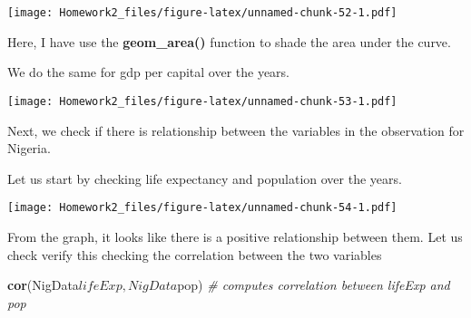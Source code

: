 \documentclass[]{article}
\newenvironment{Shaded}{\begin{snugshade}}{\end{snugshade}}
\newcommand{\KeywordTok}[1]{\textcolor[rgb]{0.13,0.29,0.53}{\textbf{{#1}}}}
\newcommand{\DataTypeTok}[1]{\textcolor[rgb]{0.13,0.29,0.53}{{#1}}}
\newcommand{\StringTok}[1]{\textcolor[rgb]{0.31,0.60,0.02}{{#1}}}
\newcommand{\CommentTok}[1]{\textcolor[rgb]{0.56,0.35,0.01}{\textit{{#1}}}}
\newcommand{\NormalTok}[1]{{#1}}
\begin{document}
\texttt{[image: Homework2\_files/figure-latex/unnamed-chunk-52-1.pdf]}

Here, I have use the \textbf{geom\_area()} function to shade the area
under the curve.

We do the same for gdp per capital over the years.

\begin{Shaded}
\end{Shaded}

\texttt{[image: Homework2\_files/figure-latex/unnamed-chunk-53-1.pdf]}

Next, we check if there is relationship between the variables in the
observation for Nigeria.

Let us start by checking life expectancy and population over the years.

\begin{Shaded}
\end{Shaded}

\texttt{[image: Homework2\_files/figure-latex/unnamed-chunk-54-1.pdf]}

From the graph, it looks like there is a positive relationship between
them. Let us check verify this checking the correlation between the two
variables

\begin{Shaded}
\begin{Highlighting}[]
\KeywordTok{cor}\NormalTok{(NigData$lifeExp,NigData$pop)  }\CommentTok{# computes correlation between lifeExp and pop}
\end{Highlighting}
\end{Shaded}
\end{document}
